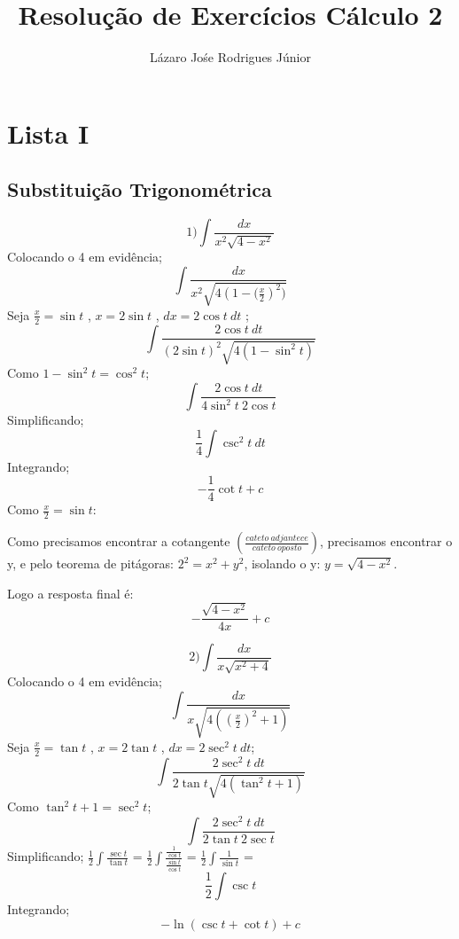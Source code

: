 \documentclass[fleqn, twocolumn]{article}
\title{Resolução de Exercícios Cálculo 2}
\author{Lázaro Jośe Rodrigues Júnior}
\begin{document}
    \maketitle
    
    \section{Lista I}
    \subsection{Substituição Trigonométrica}   
    \[1) \int \frac{dx}{x^2 \sqrt{4-x^2}}  \]
    Colocando o 4 em evidência;
        \[ \int \frac{dx}{x^2 \sqrt{4(1-{(\frac{x}{2}})^2)}}\]
    Seja $\frac{x}{2} = \sin{t}$ , $x = 2 \sin{t}$ , $ dx = 2\cos{t}\ dt$ ;
        \[ \int \frac{2\cos{t}\ dt}{(2\sin{t})^2 \sqrt{4(1-{\sin^2{t}})}}\]
    Como $1-\sin^2{t} = \cos^2{t}$;
        \[ \int \frac{2\cos{t}\ dt}{4\sin^2{t}\ 2\cos{t}} \]
    Simplificando;
        \[\frac{1}{4}\int \csc^2{t}\ dt \]
    Integrando;
        \[-\frac{1}{4}\cot{t} + c\]
    Como $\frac{x}{2} = \sin{t}$:
 

    Como precisamos encontrar a cotangente $(\frac{cateto\ adjantece}{cateto\ oposto})$, precisamos encontrar o y, e pelo teorema
de pitágoras: $2^2 = x^2 + y^2$, isolando o y: $y = \sqrt{4-x^2}$.
   
    Logo a resposta final é: \[-\frac{\sqrt{4-x^2}}{4x} +c\]

    \[2) \int \frac{dx}{x \sqrt{x^2+4}}  \]
    Colocando o 4 em evidência;
        \[ \int \frac{dx}{x \sqrt{4((\frac{x}{2})^2 + 1)}}\]
    Seja $\frac{x}{2} = \tan{t}$ , $x = 2 \tan{t}$ , $ dx = 2\sec^2{t}\ dt$;
        \[ \int \frac{2\sec^2{t}\ dt}{2 \tan{t} \sqrt{4(\tan^2{t} + 1)}}\]
    Como $\tan^2{t}+1 = \sec^2{t}$;
        \[ \int \frac{2\sec^2{t}\ dt}{2\tan{t}\ 2\sec{t}} \]
    Simplificando;
        $\frac{1}{2}\int \frac{\sec{t}}{\tan{t}}$
    =
        $\frac{1}{2}\int \frac{\frac{1}{\cos{t}}}{\frac{\sin{t}}{\cos{t}}}$
    =
        $\frac{1}{2}\int \frac{1}{\sin{t}}$
    =
        \[\frac{1}{2}\int \csc{t}\]
    Integrando;
        \[-\ln(\csc{t}+\cot{t})+c\]
    \newpage
\end{document}
